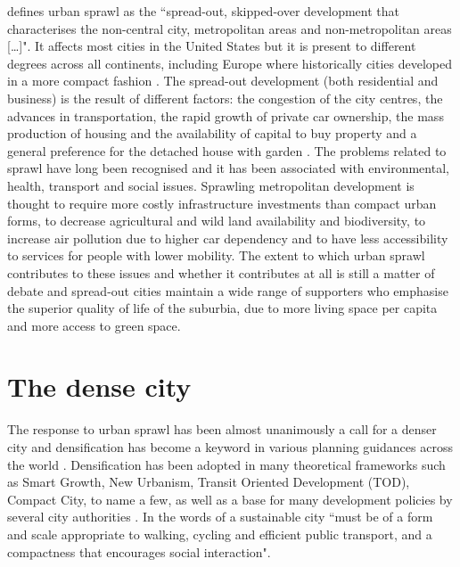 \documentclass [a4paper,12pt]{article} %
\begin{document}
\cite{ewing1997angeles} defines urban sprawl as the ``spread-out, skipped-over development that characterises the non-central city, metropolitan areas and non-metropolitan areas [\ldots]".  It affects most cities in the United States but it is present to different degrees across all continents, including Europe \citep{EuropeanEnvironmentAgency2006} where historically cities developed in a more compact fashion . The spread-out development (both residential and business) is the result of different factors: the congestion of the city centres, the advances in transportation, the rapid growth of private car ownership, the mass production of housing and the availability of capital to buy property and a general preference for the detached house with garden \citep{EuropeanEnvironmentAgency2006, Neuman2005}. 
The problems related to sprawl have long been recognised \citep{RealEstate1974, burchell1998costs, jackson1985crabgrass} and it has been associated with environmental, health, transport and social issues. Sprawling metropolitan development is thought to require more costly infrastructure investments than compact urban forms, to decrease agricultural and wild land availability and biodiversity, to increase air pollution due to higher car dependency and to have less accessibility to services for people with lower mobility.
The extent to which urban sprawl contributes to these issues and whether it contributes at all is still a matter of debate and spread-out cities maintain a wide range of supporters who emphasise the superior quality of life of the suburbia, due to more living space per capita and more access to green space.

\section*{The dense city}

The response to urban sprawl has been almost unanimously a call for a denser city \citep{CommissionEuropeanComm1990, UnitedNations1992, anderson1998uli, national1999our, american1999planning, Eea1999} and densification has become a keyword in various planning guidances across the world \citep{LondonPlan2006, UKGov1994, OECD2012}. 
Densification has been adopted in many theoretical frameworks such as Smart Growth, New Urbanism, Transit Oriented Development (TOD), Compact City, to name a few, as well as a base for many development policies by several city authorities \citep{UKGovPPG3, Rogers2005, council2009vancouver, Dieleman2003}. In the words of \cite{elkin1991reviving} a sustainable city ``must be of a form and scale appropriate to walking, cycling and efficient public transport, and a compactness that encourages social interaction". 
\end{document}
